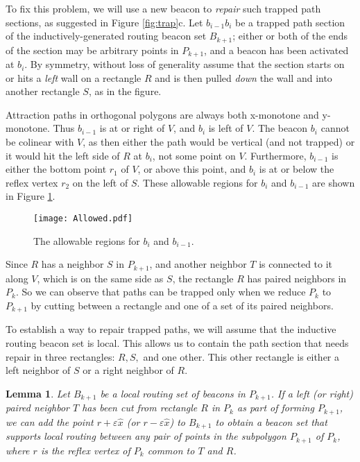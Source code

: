 \documentclass{article}
\newtheorem{lemma}{Lemma}
\begin{document}
	To fix this problem, we will use a new beacon to \emph{repair} such trapped path
	sections, as suggested in Figure \ref{fig:trap}c.
	Let $b_{i-1} b_i$ be a trapped path section of the inductively-generated
	routing beacon set $B_{k+1}$; either or both of the ends of the section may be arbitrary
	points in $P_{k+1}$, and a beacon has been activated at $b_i$.
	By symmetry, without loss of generality assume that the section starts on or
	hits a \emph{left} wall on a rectangle $R$ and is then pulled
	\emph{down} the wall and into another rectangle $S$, as in the figure.
	
	Attraction paths in orthogonal polygons are always both x-monotone and
	y-monotone.
	Thus $b_{i-1}$ is at or right of $V$, and $b_i$ is left of $V$.
	The beacon $b_i$ cannot be colinear with $V$, as then either the path
	would be vertical (and not trapped) or it would hit the left side of $R$
	at $b_i$, not some point on $V$.
	Furthermore, $b_{i-1}$ is either the bottom point $r_1$ of $V$, or above this
	point, and $b_i$ is at or below the reflex vertex $r_2$ on the left of $S$.
	These allowable regions for $b_i$ and $b_{i-1}$ are shown in Figure
	\ref{fig:allowable}.

	\begin{figure}[htbp] 
		\begin{center}
			\texttt{[image: Allowed.pdf]}
		\end{center}
		\caption{
		    The allowable regions for $b_i$ and $b_{i-1}$.
		}
		\label{fig:allowable}
	\end{figure}

	Since $R$ has a neighbor $S$ in $P_{k+1}$, and another neighbor $T$
	is connected to it along $V$, which is on the same side as $S$,
	the rectangle $R$ has paired neighbors in $P_k$.
	So we can observe that
	paths can be trapped only when we reduce $P_k$ to $P_{k+1}$ by cutting
	between a rectangle and one of a set of its paired neighbors.
	
	To establish a way to repair trapped paths, 
	we will assume that the inductive routing beacon set is local.  This allows us
	to contain the path section that needs repair in three rectangles: $R, S,$ and
	one other.  This other rectangle is either a left neighbor of $S$ or a right
	neighbor of $R$.

	\begin{lemma}\label{lem:repair}
		Let $B_{k+1}$ be a local routing set of beacons in $P_{k+1}$.
		If a left (or right) paired neighbor $T$ has
		been cut from rectangle $R$ in $P_k$ as part of forming $P_{k+1}$, we can add
		the point $r + \varepsilon\hat{x}$ (or $r - \varepsilon\hat{x}$) to $B_{k+1}$ to obtain a beacon set that supports local
		routing between any pair of points in the subpolygon $P_{k+1}$ of $P_k$, where $r$ is the reflex
		vertex of $P_{k}$ common to $T$ and $R$.
	\end{lemma}
\end{document}
